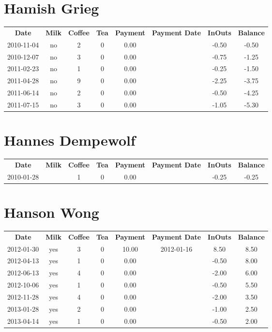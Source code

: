 \section{Hamish Grieg}

\begin{center}
\begin{tabular}{cccccccc}
\textbf{Date} & \textbf{Milk} & \textbf{Coffee} & \textbf{Tea} & \textbf{Payment} & \textbf{Payment Date} & \textbf{InOuts} & \textbf{Balance} \\
2010-11-04 & no & 2 & 0 & 0.00 &  & -0.50 & -0.50\\ 
2010-12-07 & no & 3 & 0 & 0.00 &  & -0.75 & -1.25\\ 
2011-02-23 & no & 1 & 0 & 0.00 &  & -0.25 & -1.50\\ 
2011-04-28 & no & 9 & 0 & 0.00 &  & -2.25 & -3.75\\ 
2011-06-14 & no & 2 & 0 & 0.00 &  & -0.50 & -4.25\\ 
2011-07-15 & no & 3 & 0 & 0.00 &  & -1.05 & -5.30
\end{tabular}
\end{center}

\section{Hannes Dempewolf}

\begin{center}
\begin{tabular}{cccccccc}
\textbf{Date} & \textbf{Milk} & \textbf{Coffee} & \textbf{Tea} & \textbf{Payment} & \textbf{Payment Date} & \textbf{InOuts} & \textbf{Balance} \\
2010-01-28 &  & 1 & 0 & 0.00 &  & -0.25 & -0.25
\end{tabular}
\end{center}

\section{Hanson Wong}

\begin{center}
\begin{tabular}{cccccccc}
\textbf{Date} & \textbf{Milk} & \textbf{Coffee} & \textbf{Tea} & \textbf{Payment} & \textbf{Payment Date} & \textbf{InOuts} & \textbf{Balance} \\
2012-01-30 & yes & 3 & 0 & 10.00 & 2012-01-16 &  8.50 & 8.50\\ 
2012-04-13 & yes & 1 & 0 &  0.00 &  & -0.50 & 8.00\\ 
2012-06-13 & yes & 4 & 0 &  0.00 &  & -2.00 & 6.00\\ 
2012-10-06 & yes & 1 & 0 &  0.00 &  & -0.50 & 5.50\\ 
2012-11-28 & yes & 4 & 0 &  0.00 &  & -2.00 & 3.50\\ 
2013-01-28 & yes & 2 & 0 &  0.00 &  & -1.00 & 2.50\\ 
2013-04-14 & yes & 1 & 0 &  0.00 &  & -0.50 & 2.00
\end{tabular}
\end{center}

